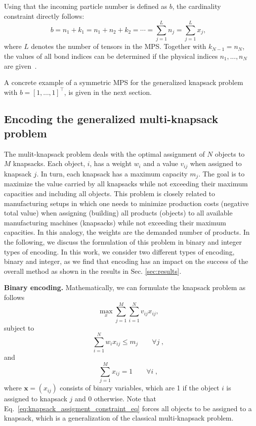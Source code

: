 Using that the incoming particle number is defined as $b$, the cardinality constraint directly follows:
\begin{equation}
    b = n_1 + k_{1} = n_1 + n_2 + k_{2} =\cdots= \sum_{j=1}^L n_j = \sum_{j=1}^L x_j,
\end{equation}
where $L$ denotes the number of tensors in the MPS. 
Together with $k_{N-1} = n_N$, the values of all bond indices can be determined if the physical indices $n_1,...,n_N$ are given~\cite{lopezpiqueres2023symmetric}. 

A concrete example of a symmetric MPS for the generalized knapsack problem with $b=[1,\ldots,1]^{\top}$, is given in the next section.

\subsection{Encoding the generalized multi-knapsack problem}\label{sec:knapsack}


The mulit-knapsack problem deals with the optimal assignment of $N$ objects to $M$ knapsacks. Each object, $i$, has a weight $w_{i}$ and a value $v_{ij}$ when assigned to knapsack $j$. In turn, each knapsack has a maximum capacity $m_j$. The goal is to maximize the value carried by all knapsacks while not exceeding their maximum capacities and including all objects. This problem is closely related to manufacturing setups in which one needs to minimize production costs (negative total value) when assigning (building) all products (objects) to all available manufacturing machines (knapsacks) while not exceeding their maximum capacities. In this analogy, the weights are the demanded number of products. In the following, we discuss the formulation of this problem in binary and integer types of encoding.
In this work, we consider two different types of encoding, binary and integer, as we find that encoding has an impact on the success of the overall method as shown in the results in Sec. \ref{sec:results}.

{\bf Binary encoding.}
Mathematically, we can formulate the knapsack problem as follows
    \begin{equation}\label{eq:knapsack_problem_formulation}
        \max_x \sum_{j=1}^{M}\sum_{i=1}^{N} v_{ij} x_{ij},
    \end{equation}
    subject to
    \begin{equation}\label{eq:knapsack_capacity_constraint_ineq}
        \sum_{i=1}^{N} w_{i} x_{ij} \leq m_j \hspace{2em}\forall j\;,
    \end{equation}
    and 
    \begin{equation}\label{eq:knapsack_assigment_constraint_eq}
        \sum_{j=1}^{M} x_{ij} = 1 \hspace{2em}\forall i\;,
    \end{equation}
where $\mathbf{x}=(x_{ij})$ consists of binary variables, which are 1 if the object $i$ is assigned to knapsack $j$ and 0 otherwise. Note that Eq.~\eqref{eq:knapsack_assigment_constraint_eq} forces all objects to be assigned to a knapsack, which is a generalization of the classical multi-knapsack problem.


